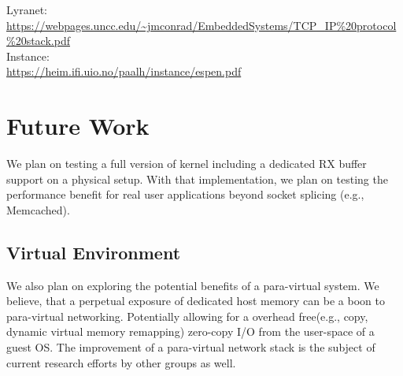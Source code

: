 Lyranet:\\
\url{https://webpages.uncc.edu/~jmconrad/EmbeddedSystems/TCP_IP\%20protocol\%20stack.pdf}\\
Instance:\\
\url{https://heim.ifi.uio.no/paalh/instance/espen.pdf}\\

\section{Future Work}
We plan on testing a full version of \oursys kernel including a dedicated RX buffer support on a physical setup. With that implementation, we plan on testing the performance benefit for real user applications beyond socket splicing (e.g., Memcached).

\subsection{Virtual Environment}

We also plan on exploring the potential benefits of \oursys a para-virtual system. We believe, that a perpetual exposure of dedicated host memory can be a boon to para-virtual networking. Potentially allowing for a overhead free(e.g., copy, dynamic virtual memory remapping) zero-copy I/O from the user-space of a guest OS. The improvement of a para-virtual network stack is the subject of current research efforts by other groups as well\cite{mikelangelo, mikelangelo-empty}.



